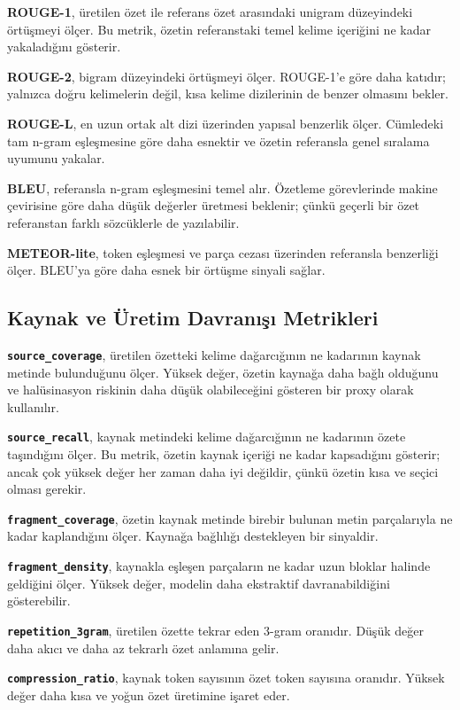 \documentclass[12pt,a4paper]{article}
\begin{document}
\textbf{ROUGE-1}, üretilen özet ile referans özet arasındaki unigram düzeyindeki örtüşmeyi ölçer. Bu metrik, özetin referanstaki temel kelime içeriğini ne kadar yakaladığını gösterir.

\textbf{ROUGE-2}, bigram düzeyindeki örtüşmeyi ölçer. ROUGE-1'e göre daha katıdır; yalnızca doğru kelimelerin değil, kısa kelime dizilerinin de benzer olmasını bekler.

\textbf{ROUGE-L}, en uzun ortak alt dizi üzerinden yapısal benzerlik ölçer. Cümledeki tam n-gram eşleşmesine göre daha esnektir ve özetin referansla genel sıralama uyumunu yakalar.

\textbf{BLEU}, referansla n-gram eşleşmesini temel alır. Özetleme görevlerinde makine çevirisine göre daha düşük değerler üretmesi beklenir; çünkü geçerli bir özet referanstan farklı sözcüklerle de yazılabilir.

\textbf{METEOR-lite}, token eşleşmesi ve parça cezası üzerinden referansla benzerliği ölçer. BLEU'ya göre daha esnek bir örtüşme sinyali sağlar.

\subsection{Kaynak ve Üretim Davranışı Metrikleri}

\textbf{\texttt{source\_coverage}}, üretilen özetteki kelime dağarcığının ne kadarının kaynak metinde bulunduğunu ölçer. Yüksek değer, özetin kaynağa daha bağlı olduğunu ve halüsinasyon riskinin daha düşük olabileceğini gösteren bir proxy olarak kullanılır.

\textbf{\texttt{source\_recall}}, kaynak metindeki kelime dağarcığının ne kadarının özete taşındığını ölçer. Bu metrik, özetin kaynak içeriği ne kadar kapsadığını gösterir; ancak çok yüksek değer her zaman daha iyi değildir, çünkü özetin kısa ve seçici olması gerekir.

\textbf{\texttt{fragment\_coverage}}, özetin kaynak metinde birebir bulunan metin parçalarıyla ne kadar kaplandığını ölçer. Kaynağa bağlılığı destekleyen bir sinyaldir.

\textbf{\texttt{fragment\_density}}, kaynakla eşleşen parçaların ne kadar uzun bloklar halinde geldiğini ölçer. Yüksek değer, modelin daha ekstraktif davranabildiğini gösterebilir.

\textbf{\texttt{repetition\_3gram}}, üretilen özette tekrar eden 3-gram oranıdır. Düşük değer daha akıcı ve daha az tekrarlı özet anlamına gelir.

\textbf{\texttt{compression\_ratio}}, kaynak token sayısının özet token sayısına oranıdır. Yüksek değer daha kısa ve yoğun özet üretimine işaret eder.
\end{document}
